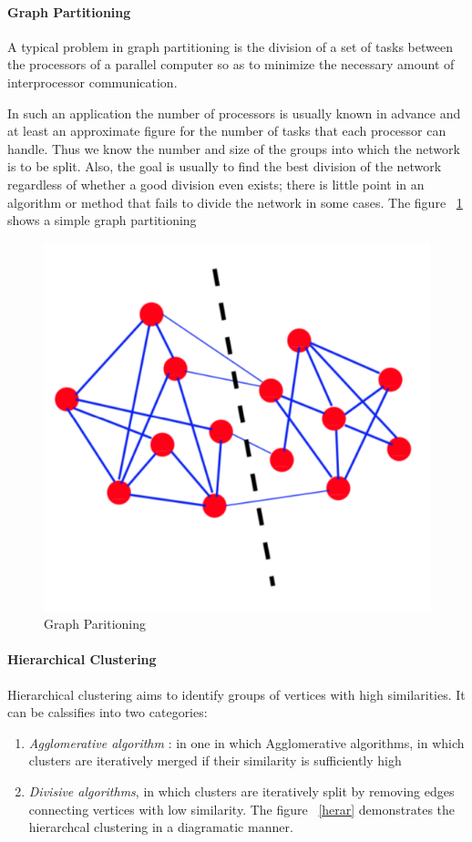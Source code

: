 \paragraph{Graph Partitioning}
 A typical problem in graph partitioning is the division of a set of tasks between the processors of a parallel computer so as to minimize the necessary amount of interprocessor communication.
 \par In such an application the number of processors is usually known in advance and at least an approximate figure for the number of tasks that each processor can handle. Thus we know the number and size of the groups into which the network is to be split. Also, the goal is usually to find the best division of the network regardless of whether a good division even exists; there is little point in an algorithm or method that fails to divide the network in some cases.\cite{newman2006modularity}
The figure ~\ref{grapar} shows a simple graph partitioning
\begin{figure}[H]
\centering
\includegraphics[scale=0.3]{graphpart.png}
\caption{\label{grapar}Graph Paritioning}

\end{figure}

\paragraph{Hierarchical Clustering}
Hierarchical clustering aims to identify groups of vertices with high similarities. It can be calssifies into two categories:
 \begin{enumerate}
\item \textit{Agglomerative algorithm} : in one in which Agglomerative algorithms, in which clusters are iteratively merged if their similarity is sufficiently
high
\item \textit{Divisive algorithms}, in which clusters are iteratively
split by removing edges connecting vertices with
low similarity.
The figure ~\ref{herar} demonstrates the hierarchcal clustering in a diagramatic manner.
\end{enumerate} 

